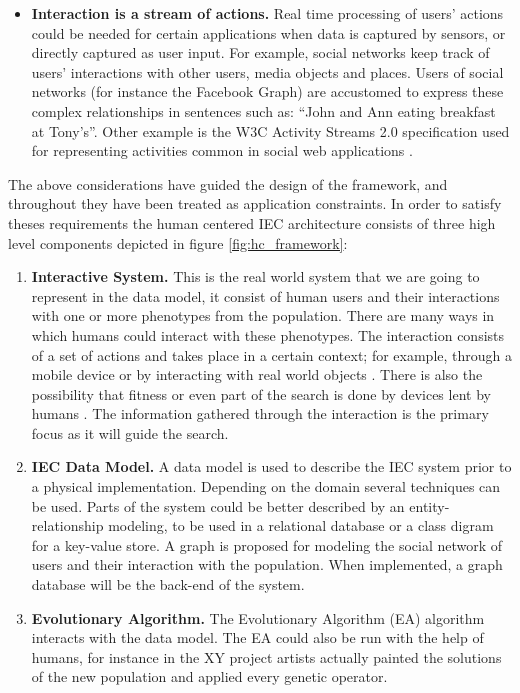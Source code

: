 \begin{itemize}
\item {\bf Interaction is a stream of actions.}
  Real time processing of users' actions could be needed for certain applications when data is 
  captured by sensors, or directly captured as user input. For example, social networks keep
  track of users' interactions with other users, media objects and places. Users of 
  social networks (for instance the Facebook Graph) are accustomed to express these 
  complex relationships in sentences such as: ``John and Ann eating breakfast at Tony's''. 
  Other example is the W3C Activity Streams 2.0 specification used for representing activities 
  common in social web applications \cite{json:streams}. 
\end{itemize}

The above considerations have guided the design of the framework, and throughout they have been
treated as application constraints. In order to satisfy theses requirements the
human centered IEC architecture consists of three high level components depicted
in figure \ref{fig:hc_framework}:

\begin{enumerate}
  \item {\bf Interactive System.} 
  This is the real world system that we are going to represent in the data model, 
  it consist of human users and their interactions with one or more phenotypes
  from the population. There are many ways in which humans could interact 
  with these phenotypes. The interaction consists of a set of actions and 
  takes place in a certain context; for example, through a mobile device  
  or by interacting with real world objects 
  \cite{de2014artists,de2013unplugging}. 
  There is also the possibility that fitness or even part of the search 
  is done by devices lent by humans \cite{DBLP:conf/gecco/MereloCGCRV16}.
  The information gathered through the interaction is the primary focus
  as it will guide the search. 

  \item {\bf IEC Data Model.}
  A data model is used to describe the IEC system prior to a physical 
  implementation.  Depending on the domain several techniques can be used.
  Parts of the system could be better described by an entity-relationship 
  modeling, to be used in a relational database or a class digram for a 
  key-value store. A graph is proposed for modeling the social network of users 
  and their interaction with the population. When implemented, a graph database 
  will be the back-end of the system. 

  \item {\bf Evolutionary Algorithm.} 
  The Evolutionary Algorithm (EA) algorithm interacts with the data model. The EA could also be run with the help of
  humans, for instance in the XY project \cite{de2013unplugging} artists actually painted
  the solutions of the new population and applied every genetic operator.
\end{enumerate}

